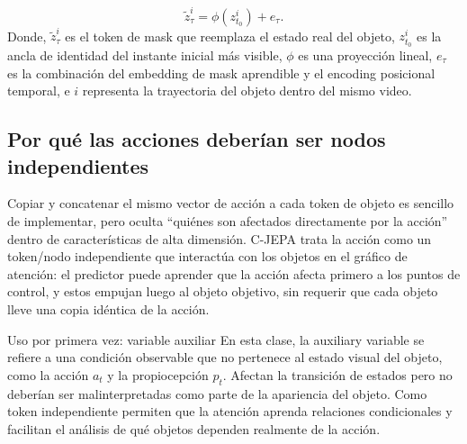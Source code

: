 \[
\tilde z_\tau^i=\phi(z_{t_0}^i)+e_\tau.
\]
Donde, $\tilde z_\tau^i$ es el token de mask que reemplaza el estado real del objeto, $z_{t_0}^i$ es la ancla de identidad del instante inicial más visible, $\phi$ es una proyección lineal, $e_\tau$ es la combinación del embedding de mask aprendible y el encoding posicional temporal, e $i$ representa la trayectoria del objeto dentro del mismo video.


\subsection{Por qué las acciones deberían ser nodos independientes}

Copiar y concatenar el mismo vector de acción a cada token de objeto es sencillo de implementar, pero oculta ``quiénes son afectados directamente por la acción'' dentro de características de alta dimensión. C-JEPA trata la acción como un token/nodo independiente que interactúa con los objetos en el gráfico de atención: el predictor puede aprender que la acción afecta primero a los puntos de control, y estos empujan luego al objeto objetivo, sin requerir que cada objeto lleve una copia idéntica de la acción.



\begin{knowledgebox}{Uso por primera vez: variable auxiliar}
En esta clase, la auxiliary variable se refiere a una condición observable que no pertenece al estado visual del objeto, como la acción $a_t$ y la propiocepción $p_t$. Afectan la transición de estados pero no deberían ser malinterpretadas como parte de la apariencia del objeto. Como token independiente permiten que la atención aprenda relaciones condicionales y facilitan el análisis de qué objetos dependen realmente de la acción.
\end{knowledgebox}

